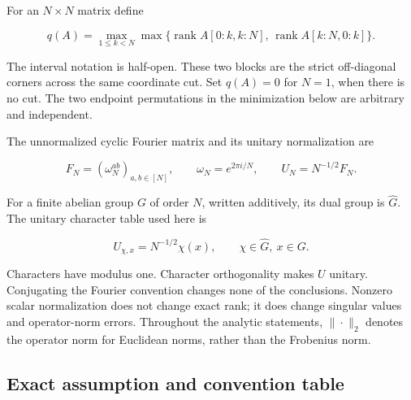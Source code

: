 \documentclass[
  11pt,
  letterpaper,
]{article}
\begin{document}
For an \(N\times N\) matrix define

\[
q(A)=\max_{1\leq k<N}\max\bigl\{
\operatorname{rank}A[0:k,k:N],\,
\operatorname{rank}A[k:N,0:k]\bigr\}.                 \tag{1}
\]

The interval notation is half-open. These two blocks are the strict
off-diagonal corners across the same coordinate cut. Set \(q(A)=0\) for
\(N=1\), when there is no cut. The two endpoint permutations in the
minimization below are arbitrary and independent.

The unnormalized cyclic Fourier matrix and its unitary normalization are

\[
F_N=(\omega_N^{ab})_{a,b\in[N]},\qquad
\omega_N=e^{2\pi i/N},\qquad U_N=N^{-1/2}F_N.        \tag{2}
\]

For a finite abelian group \(G\) of order \(N\), written additively, its
dual group is \(\widehat G\). The unitary character table used here is

\[
U_{\chi,x}=N^{-1/2}\chi(x),\qquad
\chi\in\widehat G,\ x\in G.                       \tag{3}
\]

Characters have modulus one. Character orthogonality makes \(U\)
unitary. Conjugating the Fourier convention changes none of the
conclusions. Nonzero scalar normalization does not change exact rank; it
does change singular values and operator-norm errors. Throughout the
analytic statements, \(\|\cdot\|_2\) denotes the operator norm for
Euclidean norms, rather than the Frobenius norm.

\subsection{Exact assumption and convention
table}\label{exact-assumption-and-convention-table}
\end{document}
